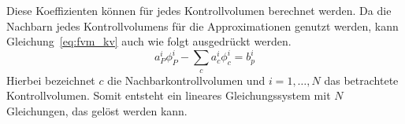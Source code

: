 Diese Koeffizienten können für jedes Kontrollvolumen berechnet werden. Da die Nachbarn jedes
Kontrollvolumens für die Approximationen genutzt werden, kann Gleichung~\eqref{eq:fvm_kv} auch
wie folgt ausgedrückt werden.
\begin{equation}
  a^i_P\phi^i_P - \sum_c a^i_c\phi^i_c = b^i_p
\end{equation}
Hierbei bezeichnet $c$ die Nachbarkontrollvolumen und $i=1,\dots,N$ das
betrachtete Kontrollvolumen. Somit entsteht ein lineares Gleichungssystem mit $N$ Gleichungen,
das gelöst werden kann.
\clearpage
